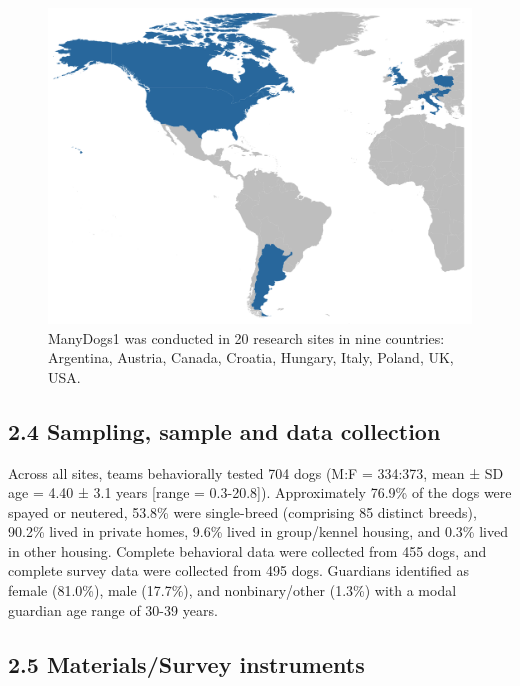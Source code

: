 \documentclass[
  man,floatsintext]{apa6}
\begin{document}
\begin{figure}

{\centering \includegraphics[width=0.8\linewidth]{md1_countries} 

}

\caption{ManyDogs1 was conducted in 20 research sites in nine countries: Argentina, Austria, Canada, Croatia, Hungary, Italy, Poland, UK, USA.}\label{fig:countries}
\end{figure}

\hypertarget{sampling-sample-and-data-collection}{%
\subsection{2.4 Sampling, sample and data collection}\label{sampling-sample-and-data-collection}}

Across all sites, teams behaviorally tested 704 dogs (M:F = 334:373, mean ± SD age = 4.40 ± 3.1 years {[}range = 0.3-20.8{]}). Approximately 76.9\% of the dogs were spayed or neutered, 53.8\% were single-breed (comprising 85 distinct breeds), 90.2\% lived in private homes, 9.6\% lived in group/kennel housing, and 0.3\% lived in other housing. Complete behavioral data were collected from 455 dogs, and complete survey data were collected from 495 dogs. Guardians identified as female (81.0\%), male (17.7\%), and nonbinary/other (1.3\%) with a modal guardian age range of 30-39 years.

\hypertarget{materialssurvey-instruments}{%
\subsection{2.5 Materials/Survey instruments}\label{materialssurvey-instruments}}
\end{document}
